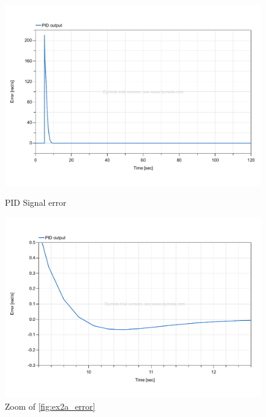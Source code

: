 \documentclass[11pt,a4paper,oneside]{article}
\begin{document}
\begin{figure}[H]
    \centering
    \begin{minipage}{0.45\textwidth}
        \centering
        \includegraphics*[width=\textwidth, keepaspectratio]{Figures/ex2a_error.pdf}
        \caption[]{\label{fig:ex2a_error} PID Signal error}
    \end{minipage}
    \hspace{0.05\textwidth}
    \begin{minipage}{0.45\textwidth}
        \centering
        \includegraphics*[width=\textwidth, keepaspectratio]{Figures/ex2a_errorZoom.pdf}
        \caption[]{\label{fig:ex2a_errorZoom} Zoom of \cref{fig:ex2a_error}}
    \end{minipage}
\end{figure}
\end{document}

